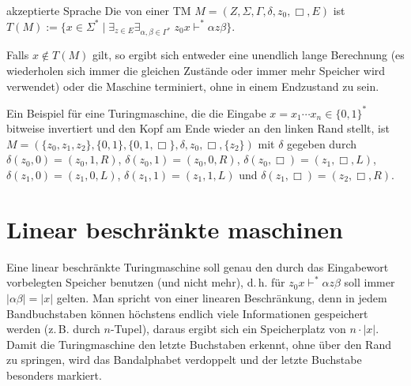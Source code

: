 \begin{Def}{akzeptierte Sprache}
    Die von einer TM $M = (Z, \Sigma, \Gamma, \delta, z_0, \Box, E)$
     ist
    $T(M) := \{x \in \Sigma^\ast \;|\;
    \exists_{z \in E} \exists_{\alpha, \beta \in \Gamma^\ast}\;
    z_0 x \vdash^\ast \alpha z \beta\}$.
\end{Def}

\begin{Bem}
    Falls $x \notin T(M)$ gilt, so ergibt sich entweder eine unendlich lange
    Berechnung (es wiederholen sich immer die gleichen Zustände oder immer
    mehr Speicher wird verwendet) oder die Maschine terminiert, ohne in einem
    Endzustand zu sein.
\end{Bem}

\linie

\begin{Bsp}
    Ein Beispiel für eine Turingmaschine, die die Eingabe
    $x = x_1 \dotsb x_n \in \{0, 1\}^\ast$ bitweise invertiert und den Kopf
    am Ende wieder an den linken Rand stellt, ist\\
    $M = (\{z_0, z_1, z_2\}, \{0, 1\}, \{0, 1, \Box\}, \delta, z_0, \Box,
    \{z_2\})$ mit $\delta$ gegeben durch\\
    $\delta(z_0, 0) = (z_0, 1, R)$,
    $\delta(z_0, 1) = (z_0, 0, R)$,
    $\delta(z_0, \Box) = (z_1, \Box, L)$,\\
    $\delta(z_1, 0) = (z_1, 0, L)$,
    $\delta(z_1, 1) = (z_1, 1, L)$ und
    $\delta(z_1, \Box) = (z_2, \Box, R)$.
\end{Bsp}

\pagebreak

\section{%
    Linear beschränkte maschinen%
}

\begin{Bem}
    Eine linear beschränkte Turingmaschine soll genau den durch das Eingabewort
    vorbelegten Speicher benutzen (und nicht mehr), d.\,h.
    für $z_0 x \vdash^\ast \alpha z \beta$ soll immer $|\alpha \beta| = |x|$
    gelten.
    Man spricht von einer linearen Beschränkung, denn in jedem Bandbuchstaben
    können höchstens endlich viele Informationen gespeichert werden
    (z.\,B. durch $n$-Tupel), daraus ergibt sich ein Speicherplatz von
    $n \cdot |x|$.
    Damit die Turingmaschine den letzte Buchstaben erkennt, ohne über den
    Rand zu springen, wird das Bandalphabet verdoppelt und der letzte Buchstabe
    besonders markiert.
\end{Bem}

